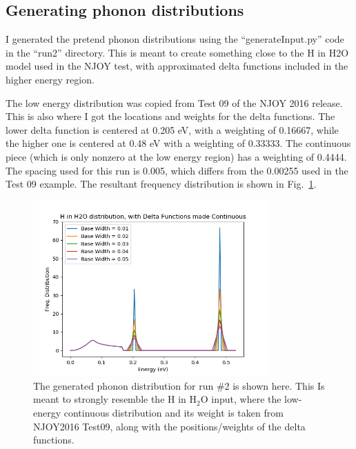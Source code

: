 \documentclass[a4paper]{article}
\begin{document}
\subsection{Generating phonon distributions}
I generated the pretend phonon distributions using the ``generateInput.py'' code in the ``run2'' directory. This is meant to create something close to the H in H2O model used in the NJOY test, with approximated delta functions included in the higher energy region.\par
The low energy distribution was copied from Test 09 of the NJOY 2016 release. This is also where I got the locations and weights for the delta functions. The lower delta function is centered at 0.205 eV, with a weighting of 0.16667, while the higher one is centered at 0.48 eV with a weighting of 0.33333. The continuous piece (which is only nonzero at the low energy region) has a weighting of 0.4444. The spacing used for this run is 0.005, which differs from the 0.00255 used in the Test 09 example. The resultant frequency distribution is shown in Fig.~\ref{fig:run2}.\par

\begin{figure}[H]
\centering
\includegraphics[width=0.8\textwidth]{phononDist_run2}
\caption{\label{fig:run2}The generated phonon distribution for run \#2 is shown here. This Is meant to strongly resemble the H in H$_2$O input, where the low-energy continuous distribution and its weight is taken from NJOY2016 Test09, along with the positions/weights of the delta functions. }
\end{figure}
\end{document}
